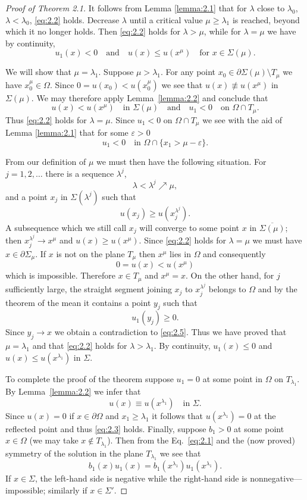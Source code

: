 \begin{proof}[Proof of Theorem 2.1]
  It follows from Lemma \ref{lemma:2.1} that for $\lambda$ close to $\lambda_0$,
  $\lambda<\lambda_0$, \eqref{eq:2.2} holds.
  Decrease $\lambda$ until a critical value $\mu\geq\lambda_1$ is reached,
  beyond which it no longer holds. Then \eqref{eq:2.2} holds for $\lambda>\mu$,
  while for $\lambda=\mu$ we have by continuity,
  \[u_1(x)<0\quad\text{and}\quad u(x)\leq u(x^\mu)\quad\text{for } x\in\Sigma(\mu).\]

  We will show that $\mu=\lambda_1$. Suppose $\mu>\lambda_1$.
  For any point $x_0\in \partial\Sigma(\mu)\setminus T_\mu$ we have
  $x_0^\mu\in\Omega$. Since $0=u(x_0)<u(x_0^\mu)$ we see that $u(x)\not\equiv u(x^\mu)$
  in $\Sigma(\mu)$. We may therefore apply Lemma~\ref{lemma:2.2} and conclude that
  \[u(x) < u(x^\mu)\quad\text{in } \Sigma(\mu)\quad\text{and}\quad
    u_1<0\quad\text{on } \Omega\cap T_\mu.\]
  Thus \eqref{eq:2.2} holds for $\lambda=\mu$. Since $u_1<0$
  on $\Omega\cap T_\mu$ we see with the aid of Lemma \ref{lemma:2.1}
  that for some $\varepsilon>0$
  \begin{equation}\label{eq:2.5}
    u_1 < 0\quad\text{in } \Omega\cap\{x_1 > \mu-\varepsilon\}.
  \end{equation}
  
  From our definition of $\mu$ we must then have the following situation.
  For $j=1,2,\ldots$ there is a sequence $\lambda^j$,
  \[\lambda < \lambda^j \nearrow \mu,\]
  and a point $x_j$ in $\Sigma(\lambda^j)$ such that
  \[u(x_j) \geq u(x_j^{\lambda^j}).\]
  A subsequence which we still call $x_j$ will converge to some point $x$
  in $\overline{\Sigma(\mu)}$;
  then $x_j^{\lambda^j}\to x^\mu$ and $u(x)\geq u(x^\mu)$.
  Since \eqref{eq:2.2} holds for $\lambda=\mu$ we must have $x\in \partial\Sigma_\mu$.
  If $x$ is not on the plane $T_\mu$ then $x^\mu$ lies in $\Omega$ and consequently
  \[0 = u(x) < u(x^\mu)\]
  which is impossible. Therefore $x\in T_\mu$ and $x^\mu=x$.
  On the other hand, for $j$ sufficiently large, the straight segment joining $x_j$
  to $x_j^{\lambda^j}$ belongs to $\Omega$ and by the theorem of the mean
  it contains a point $y_j$ such that
  \[u_1(y_j) \geq 0.\]
  Since $y_j\to x$ we obtain a contradiction to \eqref{eq:2.5}.
  Thus we have proved that $\mu=\lambda_1$
  and that \eqref{eq:2.2} holds for $\lambda>\lambda_1$.
  By continuity, $u_1(x)\leq 0$ and $u(x)\leq u(x^{\lambda_1})$ in $\Sigma$.

  To complete the proof of the theorem suppose $u_1=0$ at some point in $\Omega$
  on $T_{\lambda_1}$. By Lemma~\ref{lemma:2.2} we infer that
  \[u(x) \equiv u(x^{\lambda_1})\quad\text{in } \Sigma.\]
  Since $u(x)=0$ if $x\in\partial\Omega$ and $x_1\geq\lambda_1$
  it follows that $u(x^{\lambda_1})=0$ at the reflected point and thus \eqref{eq:2.3} holds. 
  Finally, suppose $b_1>0$ at some point $x\in\Omega$ (we may take $x\notin T_{\lambda_1}$).
  Then from the Eq.~\eqref{eq:2.1} and the (now proved) symmetry of the solution in the plane
  $T_{\lambda_1}$ we see that
  \[b_1(x)u_1(x) = b_1(x^{\lambda_1})u_1(x^{\lambda_1}).\]
  If $x\in\Sigma$, the left-hand side is negative while the right-hand side is
  nonnegative---impossible; similarly if $x\in\Sigma'$.
\end{proof}

